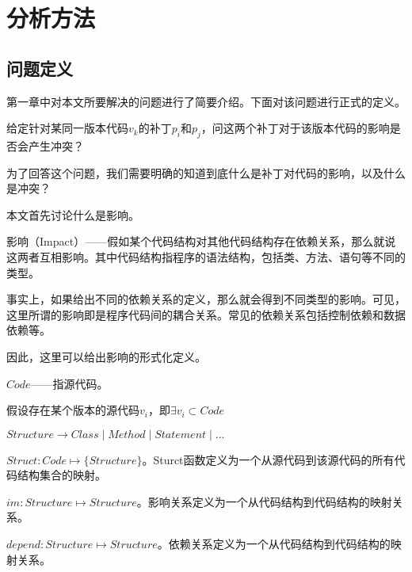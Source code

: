 \chapter{分析方法}
\section{问题定义}
\label {define_problem}
第一章中对本文所要解决的问题进行了简要介绍。下面对该问题进行正式的定义。

\begin{problem}
	\label {compatible}
	给定针对某同一版本代码$v_k$的补丁$p_i$和$p_j$，问这两个补丁对于该版本代码的影响是否会产生冲突？
\end{problem}

为了回答这个问题，我们需要明确的知道到底什么是补丁对代码的影响，以及什么是冲突？

本文首先讨论什么是影响。

\begin{definition}
	影响（Impact）——假如某个代码结构对其他代码结构存在依赖关系，那么就说这两者互相影响。其中代码结构指程序的语法结构，包括类、方法、语句等不同的类型。
\end{definition}

事实上，如果给出不同的依赖关系的定义，那么就会得到不同类型的影响。可见，这里所谓的影响即是程序代码间的耦合关系。常见的依赖关系包括控制依赖和数据依赖等。

因此，这里可以给出影响的形式化定义。

\begin{definition}
	$Code$——指源代码。
\end{definition}

假设存在某个版本的源代码$v_i$，即$\exists v_i \subset Code$

\begin{definition}
	$Structure \to Class \mid Method \mid Statement \mid ...$
\end{definition}

\begin{definition}
	$Struct: Code \mapsto \{ Structure \}$。Sturct函数定义为一个从源代码到该源代码的所有代码结构集合的映射。
\end{definition}

\begin{definition}
	$im: Structure \mapsto Structure$。影响关系定义为一个从代码结构到代码结构的映射关系。
\end{definition}

\begin{definition}
	$depend: Structure \mapsto Structure$。依赖关系定义为一个从代码结构到代码结构的映射关系。
\end{definition}


